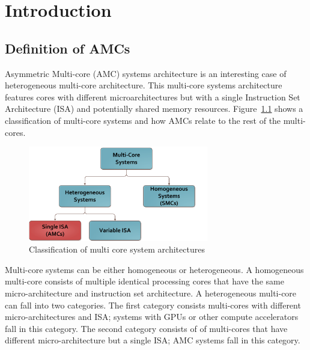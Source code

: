 
\chapter{Introduction}
\label{chapter.introduction}

\section{Definition of AMCs}
Asymmetric Multi-core (AMC) systems architecture is an interesting case of heterogeneous multi-core architecture. 
This multi-core systems architecture features cores with different microarchitectures but with a single Instruction Set Architecture (ISA) and potentially shared memory resources.
Figure~\ref{fig:heterogeneous_classification} shows a classification of multi-core systems and how AMCs relate to the rest of the multi-cores.
\begin{figure}[t]%
	\centering
	\includegraphics[width=0.7\textwidth]{figures/AMC_class.pdf}
	\caption{Classification of multi core system architectures}
	\label{fig:heterogeneous_classification}
\end{figure}
Multi-core systems can be either homogeneous or heterogeneous.
A homogeneous multi-core consists of multiple identical processing cores that have the same micro-architecture and instruction set architecture.
A heterogeneous multi-core can fall into two categories. 
The first category consists multi-cores with different micro-architectures and ISA; systems with GPUs or other compute accelerators fall in this category.
The second category consists of of multi-cores that have different micro-architecture but a single ISA; AMC systems fall in this category.


